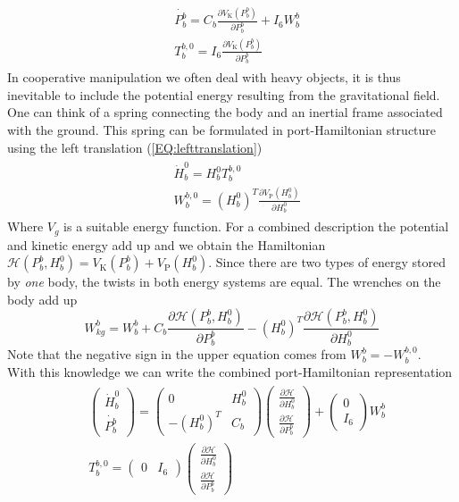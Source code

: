 \documentclass[a4paper,twoside, openright,12pt]{report}
\newcommand{\g}[1]{\text{#1}}
\begin{document}
{\begin{eqnarray}\label{EQ:PHSsimpleinertia}
\begin{aligned}
	&\dot{P_b^b} = C_b \frac{\partial V_\g{K}(P_b^b)}{\partial P_b^b} + I_6 W_{b}^b \\
	&T_b^{b,0} = I_6 \frac{\partial V_\g{K}(P_b^b)}{\partial P_b^b}
\end{aligned}
\end{eqnarray}
In cooperative manipulation we often deal with heavy objects, it is thus inevitable to include the potential energy resulting from the gravitational field. One can think of a spring connecting the body and an inertial frame associated with the ground. This spring can be formulated in port-Hamiltonian structure using the left translation (\ref{EQ:lefttranslation})
\begin{eqnarray}\label{EQ:gravityspring}
\begin{aligned}
	&\dot{H}_b^0 = H_b^0 T_b^{b,0}\\
	&W_b^{b,0} = (H_b^0)^T\frac{\partial V_\g{P}(H_b^0)}{\partial H_b^0}
\end{aligned}
\end{eqnarray}
Where $V_g$ is a suitable energy function. For a combined description the potential and kinetic energy add up and we obtain the Hamiltonian $\mathcal{H}(P_b^b,H_b^0) = V_\g{K}(P_b^b) + V_\g{P}(H_b^0)$. Since there are two types of energy stored by \emph{one} body, the twists in both energy systems are equal. The wrenches on the body add up   
\[W_{kg}^b = W_{b}^b + C_b \frac{\partial \mathcal{H}(P_b^b,H_b^0)}{\partial P_b^b} - (H_b^0)^T \frac{\partial \mathcal{H}(P_b^b,H_b^0)}{\partial H_b^0} \]
Note that the negative sign in the upper equation comes from $W_b^b = - W_b^{b,0} $.\\
With this knowledge we can write the combined port-Hamiltonian representation
\begin{eqnarray} \label{EQ:PHSinertia}
\begin{aligned}
&\begin{pmatrix}\dot{H}_b^0 \\ \dot{P_b^b}\end{pmatrix} =
\begin{pmatrix} 0 & H_b^0  \\
- (H_b^0)^T & C_b\end{pmatrix}
\begin{pmatrix}\frac{\partial \mathcal{H}}{\partial H_b^0} \\ \frac{\partial \mathcal{H}}{\partial P_b^b}\end{pmatrix}+
\begin{pmatrix}0 \\ I_6\end{pmatrix} W_{b}^b \\
&T_b^{b,0} = \begin{pmatrix}0 & I_6\end{pmatrix}
\begin{pmatrix}\frac{\partial \mathcal{H}}{\partial H_b^0} \\ \frac{\partial \mathcal{H}}{\partial P_b^b}\end{pmatrix}
\end{aligned}
\end{eqnarray}


}
\end{document}
